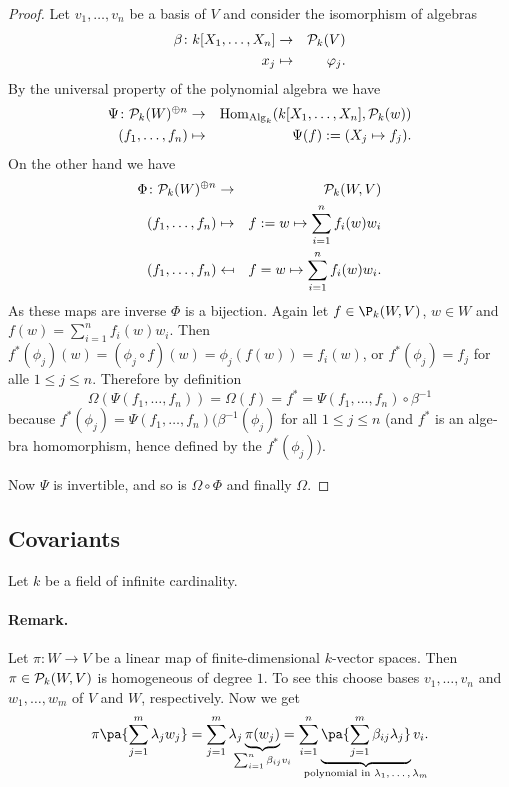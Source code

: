 \documentclass[12pt,a4paper]{scrartcl}
\theoremstyle{cplain}
\theoremstyle{cplain}
\theoremstyle{cplain}
\theoremstyle{definition}
\begin{document}
\begin{otherlanguage}{english}
\begin{proof}
  Let $v_1,\ldots,v_n$ be a basis of $V$ and consider the isomorphism of algebras
  \begin{eqnarray*}
    \beta\colon k[X_1,\ldots,X_n] &\to& \mathcal{P}_k(V) \\
    x_j &\mapsto& \varphi_j.
  \end{eqnarray*}
  By the universal property of the polynomial algebra we have
  \begin{eqnarray*}
    \Psi\colon \mathcal{P}_k(W)^{\oplus n} &\to& \operatorname{Hom}_{\operatorname{Alg}_k}(k[X_1,\ldots,X_n], \mathcal{P}_k(w)) \\
    (f_1,\ldots,f_n) &\mapsto& \Psi(f) := (X_j \mapsto f_j).
  \end{eqnarray*}
  On the other hand we have
  \begin{eqnarray*}
    \Phi\colon \mathcal{P}_k(W)^{\oplus n} &\to& \mathcal{P}_k(W,V) \\
    (f_1,\ldots,f_n) &\mapsto& f := {w \mapsto \sum_{i=1}^nf_i(w)w_i} \\
    (f_1,\ldots,f_n) &\mapsfrom& f = {w \mapsto \sum_{i=1}^nf_i(w)w_i}.
  \end{eqnarray*}
  As these maps are inverse $\Phi$ is a bijection. Again let $f\in \P_k(W,V)$, $w\in W$ and $f(w) = \sum_{i=1}^nf_i(w)w_i$. Then $f^*(\phi_j)(w) = (\phi_j \circ f)(w) = \phi_j(f(w)) = f_i(w)$, or $f^*(\phi_j) = f_j$ for alle $1\le j\le n$. Therefore by definition \[\Omega(\Psi(f_1,\ldots,f_n)) = \Omega(f) = f^* = \Psi(f_1,\ldots,f_n) \circ \beta^{-1}\] because $f^*(\phi_j) = \Psi(f_1,\ldots,f_n)(\beta^{-1}(\phi_j)$ for all $1\le j \le n$ (and $f^*$ is an algebra homomorphism, hence defined by the $f^*(\phi_j)$).
  
  Now $\Psi$ is invertible, and so is $\Omega \circ \Phi$ and finally $\Omega$.
\end{proof}

\subsection{Covariants}
Let $k$ be a field of infinite cardinality.

\paragraph{Remark.}
Let $\pi\colon W \to V$ be a linear map of finite-dimensional $k$-vector spaces. Then $\pi \in \mathcal{P}_k(W,V)$ is homogeneous of degree $1$. To see this choose bases $v_1,\ldots,v_n$ and $w_1,\ldots,w_m$ of $V$ and $W$, respectively. Now we get \[\pi\pa{\sum_{j=1}^m \lambda_jw_j} = \sum_{j=1}^m\lambda_j\underbrace{\pi(w_j)}_{\mathclap{\sum_{i=1}^n\beta_{ij}v_i}} = \sum_{i=1}^n\underbrace{\pa{\sum_{j=1}^m\beta_{ij}\lambda_j}}_{\mathclap{\text{polynomial in $\lambda_1,\ldots,\lambda_m$}}}v_i.\]


\end{otherlanguage}
\end{document}
